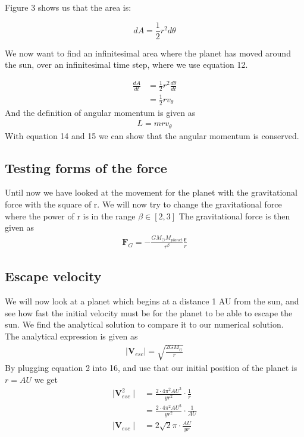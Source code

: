 \documentclass{article}
\begin{document}
Figure 3 shows us that the area is:

\begin{equation}
    dA=\frac{1}{2}r^2d\theta
\label{eq:dA}
\end{equation}

We now want to find an infinitesimal area where the planet has moved around the sun, over an infinitesimal time step, where we use equation 12.

\begin{align}
    \frac{dA}{dt}&=\frac{1}2{r^2}\frac{d\theta}{dt}\\
    &=\frac{1}{2}rv_\theta
\end{align}
And the definition of angular momentum is given as
\begin{align}
    L=mrv_\theta
\end{align}
With equation 14 and 15 we can show that the angular momentum is conserved.
\subsection{Testing forms of the force}
Until now we have looked at the movement for the planet with the gravitational force with the square of r. We will now try to change the gravitational force where the power of r is in the range $\beta \in [2,3]$ The gravitational force is then given as
\begin{align}
    \mathbf{F}_G=-\frac{GM_{\odot}M_{planet}}{r^{\beta}}\frac{\mathbf{r}}{r}
\end{align}
\subsection{Escape velocity}
We will now look at a planet which begins at a distance 1 AU from the sun, 
and see how fast the initial velocity must be for the planet to be able to escape the sun. We find the analytical solution to compare it to our numerical solution. \\
The analytical expression is given as 
\begin{align}
    \mid{\mathbf{V}_{esc}}\mid=\sqrt{\frac{2GM_{\odot}}{r}}
\end{align}
By plugging equation 2 into 16, and use that our initial position of the planet is $r=AU$ we get
\begin{align}
\mid{\mathbf{V}_{esc}^2}\mid&=\frac{2\cdot 4\pi^2AU^3}{yr^2}\cdot\frac{1}{r}\\
&=\frac{2\cdot 4\pi^2AU^3}{yr^2}\cdot\frac{1}{AU}\\
\mid{\mathbf{V}_{esc}}\mid&=2\sqrt{2}\pi\cdot\frac{AU}{yr}
\end{align}
\end{document}
